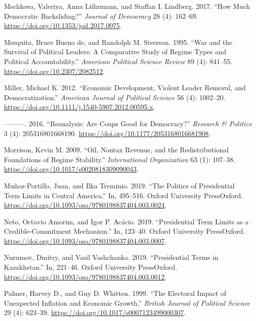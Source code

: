 \documentclass[
  12pt,
]{report}
\newlength{\cslhangindent}
\newenvironment{CSLReferences}[2] %
 {\begin{list}{}{%
  \setlength{\itemindent}{0pt}
  \setlength{\leftmargin}{0pt}
  \setlength{\parsep}{0pt}
  \ifodd #1
   \setlength{\leftmargin}{\cslhangindent}
   \setlength{\itemindent}{-1\cslhangindent}
  \fi
  \setlength{\itemsep}{#2\baselineskip}}}
 {\end{list}}
\begin{document}
\begin{CSLReferences}{1}{0}
Mechkova, Valeriya, Anna Lührmann, and Staffan I. Lindberg. 2017. {``How
Much Democratic Backsliding?''} \emph{Journal of Democracy} 28 (4):
162--69. \url{https://doi.org/10.1353/jod.2017.0075}.

Mesquita, Bruce Bueno de, and Randolph M. Siverson. 1995. {``War and the
Survival of Political Leaders: A Comparative Study of Regime Types and
Political Accountability.''} \emph{American Political Science Review} 89
(4): 841--55. \url{https://doi.org/10.2307/2082512}.

Miller, Michael K. 2012. {``Economic Development, Violent Leader
Removal, and Democratization.''} \emph{American Journal of Political
Science} 56 (4): 1002--20.
\url{https://doi.org/10.1111/j.1540-5907.2012.00595.x}.

---------. 2016. {``Reanalysis: Are Coups Good for Democracy?''}
\emph{Research \& Politics} 3 (4): 205316801668190.
\url{https://doi.org/10.1177/2053168016681908}.

Morrison, Kevin M. 2009. {``Oil, Nontax Revenue, and the
Redistributional Foundations of Regime Stability.''} \emph{International
Organization} 63 (1): 107--38.
\url{https://doi.org/10.1017/s0020818309090043}.

Muñoz-Portillo, Juan, and Ilka Treminio. 2019. {``The Politics of
Presidential Term Limits in Central America.''} In, 495--516. Oxford
University PressOxford.
\url{https://doi.org/10.1093/oso/9780198837404.003.0024}.

Neto, Octavio Amorim, and Igor P. Acácio. 2019. {``Presidential Term
Limits as a Credible-Commitment Mechanism.''} In, 123--40. Oxford
University PressOxford.
\url{https://doi.org/10.1093/oso/9780198837404.003.0007}.

Nurumov, Dmitry, and Vasil Vashchanka. 2019. {``Presidential Terms in
Kazakhstan.''} In, 221--46. Oxford University PressOxford.
\url{https://doi.org/10.1093/oso/9780198837404.003.0012}.

Palmer, Harvey D., and Guy D. Whitten. 1999. {``The Electoral Impact of
Unexpected Inflation and Economic Growth.''} \emph{British Journal of
Political Science} 29 (4): 623--39.
\url{https://doi.org/10.1017/s0007123499000307}.


\end{CSLReferences}
\end{document}
